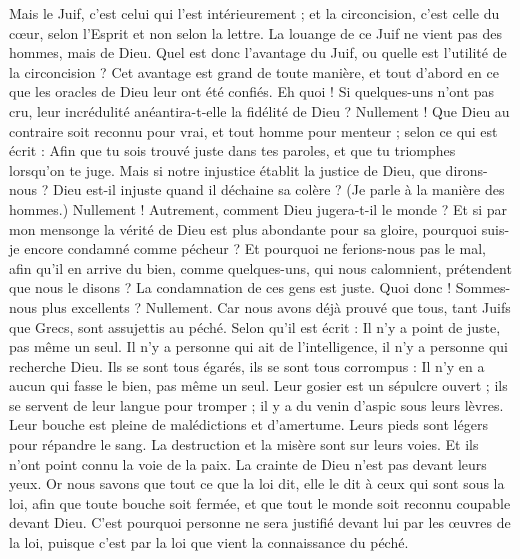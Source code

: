 \begin{multicols}{2}
Mais le Juif, c’est celui qui l’est intérieurement ; et la circoncision, c’est celle du cœur, selon l’Esprit et non selon la lettre. La louange de ce Juif ne vient pas des hommes, mais de Dieu.
\VerseOne{}Quel est donc l'avantage du Juif, ou quelle est l’utilité de la circoncision ?
Cet avantage est grand de toute manière, et tout d’abord en ce que les oracles de Dieu leur ont été confiés.
Eh quoi ! Si quelques-uns n'ont pas cru, leur incrédulité anéantira-t-elle la fidélité de Dieu ?
Nullement ! Que Dieu au contraire soit reconnu pour vrai, et tout homme pour menteur ; selon ce qui est écrit : Afin que tu sois trouvé juste dans tes paroles, et que tu triomphes lorsqu’on te juge.
Mais si notre injustice établit la justice de Dieu, que dirons-nous ? Dieu est-il injuste quand il déchaine sa colère ? (Je parle à la manière des hommes.)
Nullement ! Autrement, comment Dieu jugera-t-il le monde ?
Et si par mon mensonge la vérité de Dieu est plus abondante pour sa gloire, pourquoi suis-je encore condamné comme pécheur ?
Et pourquoi ne ferions-nous pas le mal, afin qu'il en arrive du bien, comme quelques-uns, qui nous calomnient, prétendent que nous le disons ? La condamnation de ces gens est juste.
Quoi donc ! Sommes-nous plus excellents ? Nullement. Car nous avons déjà prouvé que tous, tant Juifs que Grecs, sont assujettis au péché.
Selon qu'il est écrit : Il n'y a point de juste, pas même un seul.
Il n'y a personne qui ait de l'intelligence, il n'y a personne qui recherche Dieu.
Ils se sont tous égarés, ils se sont tous corrompus : Il n'y en a aucun qui fasse le bien, pas même un seul.
Leur gosier est un sépulcre ouvert ; ils se servent de leur langue pour tromper ; il y a du venin d'aspic sous leurs lèvres.
Leur bouche est pleine de malédictions et d'amertume.
Leurs pieds sont légers pour répandre le sang.
La destruction et la misère sont sur leurs voies.
Et ils n'ont point connu la voie de la paix.
La crainte de Dieu n'est pas devant leurs yeux.
Or nous savons que tout ce que la loi dit, elle le dit à ceux qui sont sous la loi, afin que toute bouche soit fermée, et que tout le monde soit reconnu coupable devant Dieu.
C'est pourquoi personne ne sera justifié devant lui par les œuvres de la loi, puisque c’est par la loi que vient la connaissance du péché.

\end{multicols}
